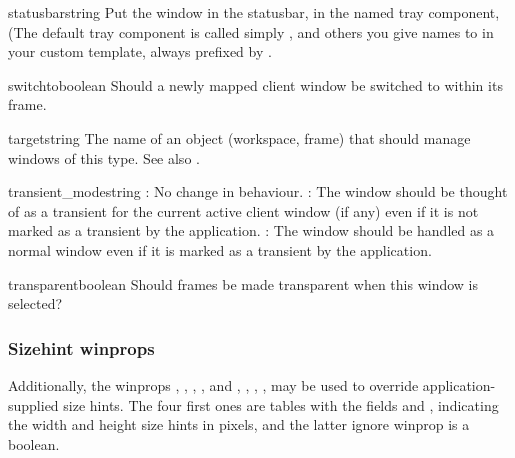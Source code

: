 \begin{winprop}{statusbar}{string}
    Put the window in the statusbar, in the named tray component,
    (The default tray component is called simply , 
    and others you give names to in your custom template, always 
    prefixed by .
\end{winprop}


\begin{winprop}{switchto}{boolean}
    Should a newly mapped client window be switched to within
    its frame.
\end{winprop}
        

\begin{winprop}{target}{string}
    The name of an object (workspace, frame) that should manage 
    windows of this type. See also .
\end{winprop}

        
\begin{winprop}{transient_mode}{string}
    : No change in behaviour. :
    The window should be thought of as a transient for the current
    active client window (if any) even if it is not marked as a
    transient by the application. : The window should 
    be handled as a normal window even if it is marked as a
    transient by the application. 
\end{winprop}


\begin{winprop}{transparent}{boolean}
    Should frames be made transparent when this window is selected? \\
\end{winprop}


\subsubsection{Sizehint winprops}

Additionally, the winprops 
,
,
,
,
and
,
,
,
,
may be used to override application-supplied size hints. The four
first ones are tables with the fields  and , indicating
the width and height size hints in pixels, and the latter ignore
winprop is a boolean. 

